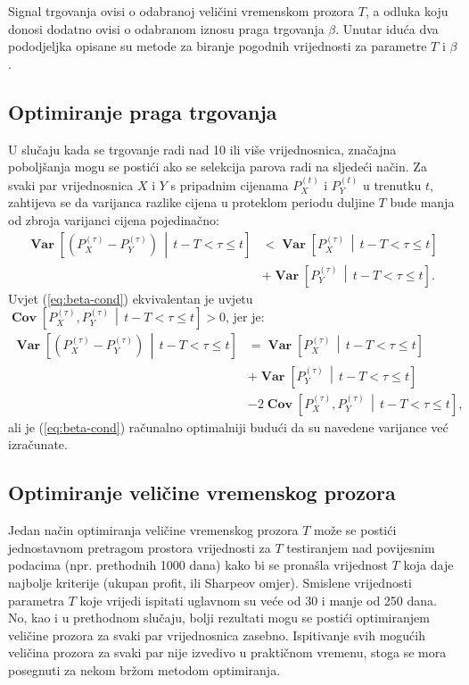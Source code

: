 \documentclass[lmodern, utf8, diplomski, numeric]{fer}
\newcommand{\Varfromto}[2]{\operatorname{\mathbf{Var}}\q[#1\, \middle\vert\, #2\w]}
\newcommand{\Covfromto}[2]{\operatorname{\mathbf{Cov}}\q[#1\, \middle\vert\, #2\w]}
\newcommand{\q}{\left}
\newcommand{\w}{\right}
\begin{document}
  Signal trgovanja ovisi o odabranoj veličini vremenskom prozora $T$, a odluka koju donosi dodatno ovisi o odabranom iznosu praga trgovanja $\beta$.
  Unutar iduća dva pododjeljka opisane su metode za biranje pogodnih vrijednosti za parametre $T$ i $\beta$.
  
  \subsection{Optimiranje praga trgovanja}
  U slučaju kada se trgovanje radi nad 10 ili više vrijednosnica, značajna poboljšanja mogu se postići ako se selekcija parova radi na sljedeći način.
  Za svaki par vrijednosnica $X$ i $Y$ s pripadnim cijenama $P_X^{(t)}$ i $P_Y^{(t)}$ u trenutku $t$, zahtijeva se da varijanca razlike cijena u proteklom periodu duljine $T$ bude manja od zbroja varijanci cijena pojedinačno:
  \begin{align}
  \Varfromto{\q(P_X^{(\tau)} - P_Y^{(\tau)}\w)}{t - T < \tau \le t} & <
  \Varfromto{P_X^{(\tau)}}{t - T < \tau \le t} \nonumber \\
  \label{eq:beta-cond}
  & + \Varfromto{P_Y^{(\tau)}}{t - T < \tau \le t}.
  \end{align}
  Uvjet (\ref{eq:beta-cond}) ekvivalentan je uvjetu $\Covfromto{P_X^{(\tau)},  P_Y^{(\tau)}}{t - T < \tau \le t} > 0$, jer je:
  \begin{align*}
  \Varfromto{\q(P_X^{(\tau)} - P_Y^{(\tau)}\w)}{t - T < \tau \le t} & =  \Varfromto{P_X^{(\tau)}}{t - T < \tau \le t} \\
  & + \Varfromto{P_Y^{(\tau)}}{t - T < \tau \le t} \\
  & - 2 \Covfromto{P_X^{(\tau)},  P_Y^{(\tau)}}{t - T < \tau \le t},
  \end{align*}
  ali je (\ref{eq:beta-cond}) računalno optimalniji budući da su navedene varijance već izračunate.

  \subsection{Optimiranje veličine vremenskog prozora} 
  Jedan način optimiranja veličine vremenskog prozora $T$ može se postići jednostavnom pretragom prostora vrijednosti za $T$ testiranjem nad povijesnim podacima (npr. prethodnih 1000 dana) kako bi se pronašla vrijednost $T$ koja daje najbolje kriterije (ukupan profit, ili Sharpeov omjer).
  Smislene vrijednosti parametra $T$ koje vrijedi ispitati uglavnom su veće od 30 i manje od 250 dana.
  No, kao i u prethodnom slučaju, bolji rezultati mogu se postići optimiranjem veličine prozora za svaki par vrijednosnica zasebno.
  Ispitivanje svih mogućih veličina prozora za svaki par nije izvedivo u praktičnom vremenu, stoga se mora posegnuti za nekom bržom metodom optimiranja.
  
\end{document}
